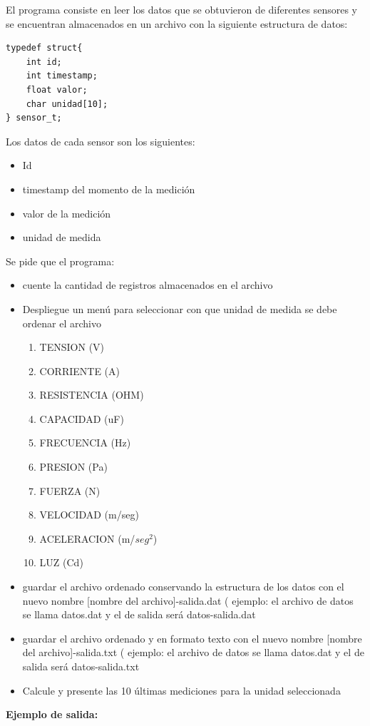 \documentclass[12pt]{article} %
\begin{document}
El programa consiste en leer los datos que se obtuvieron de diferentes sensores y se encuentran almacenados en  un archivo con la siguiente estructura de datos:
\begin{lstlisting}[escapechar=\|,label=noint]
typedef struct{
    int id;
    int timestamp;
    float valor;
    char unidad[10];
} sensor_t;
\end{lstlisting}
Los datos de cada sensor son los siguientes:
\begin{itemize}
\item Id
\item timestamp del momento de la medición
\item valor de la medición 
\item unidad de medida
\end{itemize}
Se pide que el programa:
\begin{itemize}
\item cuente la cantidad de registros almacenados en el archivo 
\item Despliegue un menú para seleccionar con que unidad de medida se debe ordenar el archivo
\begin{enumerate}
\item TENSION (V)
\item CORRIENTE (A)
\item RESISTENCIA (OHM)
\item CAPACIDAD (uF)
\item FRECUENCIA (Hz)
\item PRESION (Pa)
\item FUERZA (N)
\item VELOCIDAD (m/seg)
\item ACELERACION (m/$seg^2$)
\item LUZ (Cd)
\end{enumerate} 
\item guardar el archivo ordenado conservando la estructura de los datos con el nuevo nombre [nombre del archivo]-salida.dat ( ejemplo: el archivo de datos se llama {\color{blue}datos.dat} y el de salida será {\color{blue}datos-salida.dat}
\item guardar el archivo ordenado y en formato texto con el nuevo nombre [nombre del archivo]-salida.txt ( ejemplo: el archivo de datos se llama {\color{blue}datos.dat} y el de salida será {\color{blue}datos-salida.txt}
\item Calcule y presente las 10 últimas mediciones para la unidad seleccionada
\end{itemize}  
{\bf Ejemplo de salida:}\\
\end{document}
